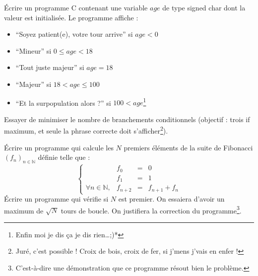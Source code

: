 \documentclass[../../../main.tex]{subfiles}
\begin{document}
 Écrire un programme C contenant une variable $age$ de type \textsf{signed char} dont la valeur est initialisée. Le programme affiche :
\begin{itemize}
	\item ``Soyez patient(e), votre tour arrive'' si $age < 0$
	\item ``Mineur'' si $0 \leq age < 18$
	\item ``Tout juste majeur'' si $age = 18$
	\item ``Majeur'' si $18 < age \leq{100}$
	\item ``Et la surpopulation alors ?'' si $100 < age$\footnote{Enfin moi je dis ça je dis rien\dots;)*}
\end{itemize}
Essayer de minimiser le nombre de branchements conditionnels (objectif : trois \textsf{if} maximum, et seule la phrase correcte doit s'afficher\footnote{Juré, c'est possible ! Croix de bois, croix de fer, si j'mens j'vais en enfer !}).
 
 Écrire un programme qui calcule les $N$ premiers éléments de la suite de Fibonacci $(f_{n})_{n\in{\mathbb{N}}}$ définie telle que :
$$
\left\{\begin{array}{llcl}
& f_{0} & = & 0 \\
& f_{1} & = & 1 \\
\forall{n\in{\mathbb{N}}}, & f_{n+2} & = & f_{n+1} + f_{n}
\end{array}\right.
$$
Écrire un programme qui vérifie si $N$ est premier. On essaiera d'avoir un maximum de $\sqrt{N}$ tours de boucle. On justifiera la correction du programme\footnote{C'est-à-dire une démonstration que ce programme résout bien le problème.}.
\end{document}
